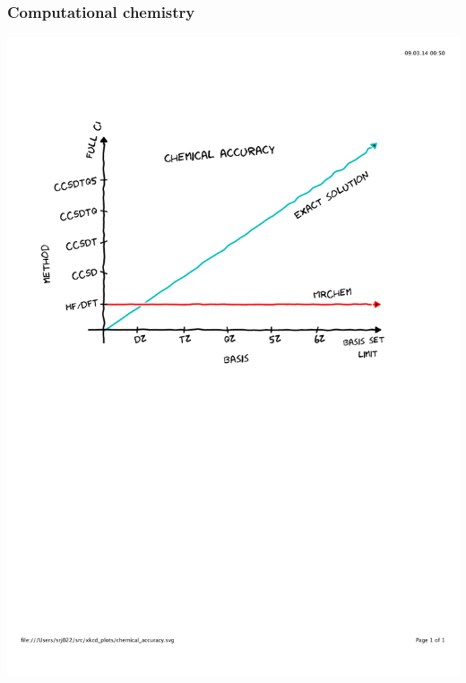 \begin{frame}
\frametitle{Computational chemistry}
\centering
\includegraphics[scale=0.5, clip, viewport = 0 300 550 800]{figures/chemical_accuracy.pdf}
\end{frame}


